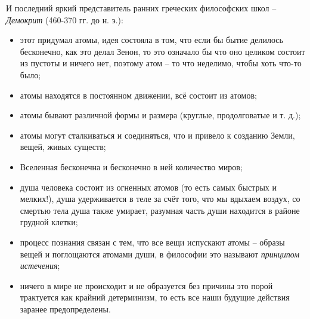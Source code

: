И последний яркий представитель ранних греческих философских школ -- \textit{Демокрит} (460-370 гг. до н. э.):
\begin{itemize}
	\itemsep-1ex
	\item этот придумал атомы, идея состояла в том, что если бы бытие делилось бесконечно, как это делал Зенон, то это означало бы что оно целиком состоит из пустоты и ничего нет, поэтому атом -- то что неделимо, чтобы хоть что-то было; 
	\item атомы находятся в постоянном движении, всё состоит из атомов;
	\item атомы бывают различной формы и размера (круглые, продолговатые и т. д.);
	\item атомы могут сталкиваться и соединяться, что и привело к созданию Земли, вещей, живых существ;
	\item Вселенная бесконечна и бесконечно в ней количество миров;
	\item душа человека состоит из огненных атомов (то есть самых быстрых и мелких!), душа удерживается в теле за счёт того, что мы вдыхаем воздух, со смертью тела душа также умирает, разумная часть души находится в районе грудной клетки;
	\item процесс познания связан с тем, что все вещи испускают атомы -- образы вещей и поглощаются атомами души, в философии это называют \textit{принципом истечения};
	\item ничего в мире не происходит и не образуется без причины это порой трактуется как крайний детерминизм, то есть все наши будущие действия заранее предопределены.
\end{itemize}
